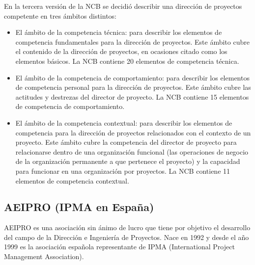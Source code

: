 En la tercera versión de la NCB se decidió describir una dirección de proyectos competente en tres ámbitos distintos:\\
\begin{itemize}
	\item El ámbito de la competencia técnica: para describir los elementos de competencia fundamentales para la dirección de proyectos. Este ámbito cubre el contenido de la dirección de proyectos, en ocasiones citado como los elementos básicos. La NCB contiene 20 elementos de competencia técnica.\\
	\item El ámbito de la competencia de comportamiento: para describir los elementos de competencia personal para la dirección de proyectos. Este ámbito cubre las actitudes y destrezas del director de proyecto. La NCB contiene 15 elementos de competencia de comportamiento.\\
	\item El ámbito de la competencia contextual: para describir los elementos de competencia para la dirección de proyectos relacionados con el contexto de un proyecto. Este ámbito cubre la competencia del director de proyecto para relacionarse dentro de una organización funcional (las operaciones de negocio de la organización permanente a que pertenece el proyecto) y la capacidad para funcionar en una organización por proyectos. La NCB contiene 11 elementos de competencia contextual.\\
\end{itemize}

\subsection{AEIPRO (IPMA en España)}

AEIPRO es una asociación sin ánimo de lucro que tiene por objetivo el desarrollo del campo de la Dirección e Ingeniería de Proyectos. Nace en 1992 y desde el año 1999 es la asociación española representante de IPMA (International Project Management Association).\\

